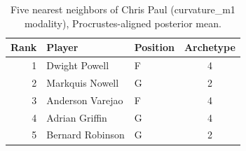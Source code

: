 \begin{table}[htbp]
  \centering\small
  \begin{tabular}{rllc}
    \toprule
    Rank & Player & Position & Archetype \\
    \midrule
    1 & Dwight Powell & F & 4 \\
    2 & Markquis Nowell & G & 2 \\
    3 & Anderson Varejao & F & 4 \\
    4 & Adrian Griffin & G & 4 \\
    5 & Bernard Robinson & G & 2 \\
    \bottomrule
  \end{tabular}
  \caption{Five nearest neighbors of Chris Paul (curvature_m1 modality), Procrustes-aligned posterior mean.}
  \label{tab:Chris_Paul_neighbors_curvature_m1}
\end{table}

